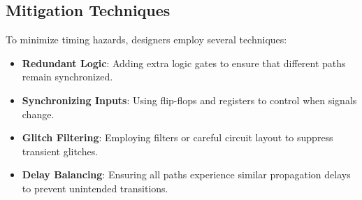 \subsection{Mitigation Techniques}

To minimize timing hazards, designers employ several techniques:
\begin{itemize}
    \item \textbf{Redundant Logic}: Adding extra logic gates to ensure that different paths remain synchronized.
    \item \textbf{Synchronizing Inputs}: Using flip-flops and registers to control when signals change.
    \item \textbf{Glitch Filtering}: Employing filters or careful circuit layout to suppress transient glitches.
    \item \textbf{Delay Balancing}: Ensuring all paths experience similar propagation delays to prevent unintended transitions.
\end{itemize}
